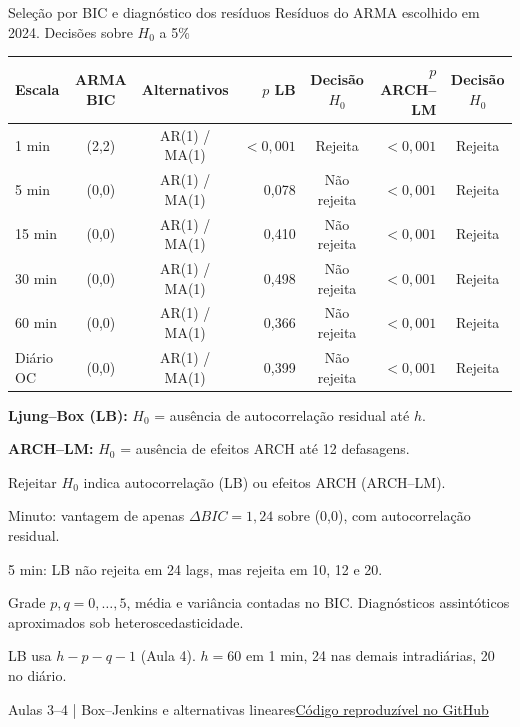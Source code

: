 \documentclass[aspectratio=169,10pt]{beamer}
\newcommand{\source}[2]{\par\vfill{\raggedright\tiny\color{muted}#1\quad\href{#2}{Código reproduzível no GitHub}\par}}
\newcommand{\tagline}[1]{{\small\color{teal}#1}\par\medskip}
\begin{document}
\begin{frame}[t]{Seleção por BIC e diagnóstico dos resíduos}
\tagline{Resíduos do ARMA escolhido em 2024. Decisões sobre $H_0$ a 5\%}
\centering\small\setlength{\tabcolsep}{3.5pt}\begin{tabular}{lccrcrc}
\toprule
Escala & ARMA BIC & Alternativos & $p$ LB & Decisão $H_0$ & $p$ ARCH--LM & Decisão $H_0$ \\ \midrule
1 min & (2,2) & AR(1) / MA(1) & $<0{,}001$ & \alert{Rejeita} & $<0{,}001$ & \alert{Rejeita} \\
5 min & (0,0) & AR(1) / MA(1) & 0,078 & Não rejeita & $<0{,}001$ & \alert{Rejeita} \\
15 min & (0,0) & AR(1) / MA(1) & 0,410 & Não rejeita & $<0{,}001$ & \alert{Rejeita} \\
30 min & (0,0) & AR(1) / MA(1) & 0,498 & Não rejeita & $<0{,}001$ & \alert{Rejeita} \\
60 min & (0,0) & AR(1) / MA(1) & 0,366 & Não rejeita & $<0{,}001$ & \alert{Rejeita} \\
Diário OC & (0,0) & AR(1) / MA(1) & 0,399 & Não rejeita & $<0{,}001$ & \alert{Rejeita} \\
\bottomrule
\end{tabular}\par
\raggedright\medskip\small\textbf{Ljung--Box (LB):} $H_0$ = ausência de autocorrelação residual até $h$.\par \textbf{ARCH--LM:} $H_0$ = ausência de efeitos ARCH até 12 defasagens.\par\smallskip \scriptsize Rejeitar $H_0$ indica autocorrelação (LB) ou efeitos ARCH (ARCH--LM).\par \smallskip\scriptsize Minuto: vantagem de apenas $\Delta BIC=1,24$ sobre (0,0), com autocorrelação residual.\par 5 min: LB não rejeita em 24 lags, mas rejeita em 10, 12 e 20.\par\smallskip Grade $p,q=0,\ldots,5$, média e variância contadas no BIC. Diagnósticos assintóticos aproximados sob heteroscedasticidade.\par LB usa $h-p-q-1$ (Aula 4). $h=60$ em 1 min, 24 nas demais intradiárias, 20 no diário.
\source{Aulas 3--4 | Box--Jenkins e alternativas lineares}{https://github.com/avilarenan/EAD6034/blob/1782cade2ed752ce6b7c1b8b10c316445aef2626/src/ead6034/annual_models.py}
\end{frame}
\end{document}
